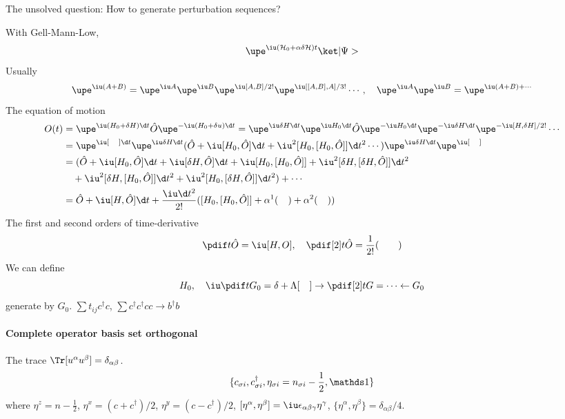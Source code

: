 The unsolved question: How to generate perturbation sequences?

With Gell-Mann-Low,
\[
  \upe^{\iu(\mathcal H_0 + \alpha\delta\mathcal H)t} \ket|\Psi>
\]
Usually
\[
  \upe^{\iu(A + B)} = \upe^{\iu A}\upe^{\iu B} \upe^{\iu[A,B]/2!}
  \upe^{\iu[[A,B],A]/3!} \cdots, \quad
  \upe^{\iu A}\upe^{\iu B} = \upe^{\iu(A + B) + \cdots}
\]
The equation of motion
\begin{equation}
\begin{aligned}
  O(t) &
= \upe^{\iu(H_0 + \delta H)\d t} \hat O \upe^{-\iu(H_0 + \delta u) \d t}
= \upe^{\iu \delta H\d t} \upe^{\iu H_0\d t} \hat O
  \upe^{-\iu H_0\d t} \upe^{-\iu\delta H\d t} \upe^{-\iu[H, \delta H]/2!}
  \cdots\\
& = \upe^{\iu[\quad] \d t} \upe^{\iu\delta H \d t}
  (\hat O + \iu[H_0, \hat O]\d t + \iu^2 [H_0,[H_0,\hat O]]\d t^2 \cdots)
  \upe^{\iu\delta H\d t}\upe^{\iu[\quad]}\\
& = (\hat O + \iu[H_0, \hat O]\d t + \iu[\delta H, \hat O]\d t
+ \iu[H_0,[H_0,\hat O]] + \iu^2[\delta H, [\delta H, \hat O]]\d t^2\\
& \quad + \iu^2[\delta H, [H_0, \hat O]]\d t^2
        + \iu^2[H_0,[\delta H, \hat O]]\d t^2)
+ \cdots\\
& = \hat O + \iu[H,\hat O] \d t + \frac{\iu \d t^2}{2!}([H_0,[H_0,\hat O]]
  + \alpha^1 (\quad) + \alpha^2 (\quad))
\end{aligned}
\end{equation}
The first and second orders of time-derivative
\begin{equation}
  \pdif t \hat O = \iu[H,O], \quad
  \pdif[2]t \hat O = \frac1{2!}(\qquad)
\end{equation}
We can define
\[
  H_0, \quad
  \iu\pdif t G_0 = \delta + \Lambda [\quad] \to
  \pdif[2]t G = \cdots \leftarrow G_0
\]
generate by $G_0$.
$\sum t_{ij} c^\dagger c$, $\sum c^\dagger c^\dagger cc \to b^\dagger b$

\paragraph{Complete operator basis set orthogonal}

The trace $\Tr[u^\alpha u^\beta] = \delta_{\alpha\beta}$.
\[
  \{
    c_{\sigma i}, c_{\sigma i}^\dagger,
    \eta_{\sigma i} = n_{\sigma i} - \frac12, \identity
  \}
\]
where $\eta^z = n - \frac12$, $\eta^x = (c + c^\dagger)/2$,
$\eta^y = (c - c^\dagger)/2$,
$[\eta^\alpha, \eta^\beta] = \iu \epsilon_{\alpha\beta\gamma} \eta^\gamma$,
$\{\eta^\alpha, \eta^\beta\} = \delta_{\alpha\beta}/4$.

